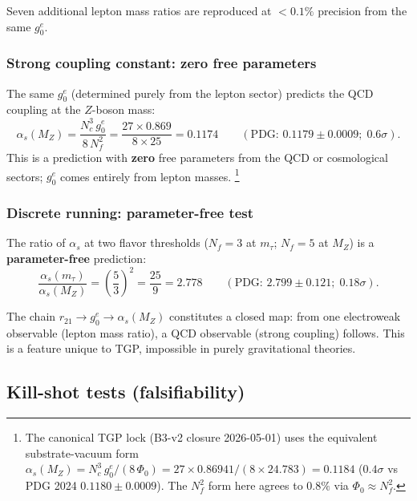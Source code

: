 \noindent
Seven additional lepton mass ratios are reproduced at
$<0.1\%$ precision from the same $g_{0}^{e}$.

\subsubsection{Strong coupling constant: zero free parameters}

The same $g_{0}^{e}$ (determined purely from the lepton sector)
predicts the QCD coupling at the $Z$-boson mass:
\begin{equation}\label{eq:alphas}
  \alpha_{s}(M_{Z})
  = \frac{N_{c}^{3}\,g_{0}^{e}}{8\,N_{f}^{2}}
  = \frac{27 \times 0.869}{8 \times 25}
  = 0.1174
  \qquad (\text{PDG: } 0.1179 \pm 0.0009;\; 0.6\sigma).
\end{equation}
This is a prediction with \textbf{zero} free parameters from the
QCD or cosmological sectors; $g_{0}^{e}$ comes entirely from lepton
masses.%
\footnote{The canonical TGP lock (B3-v2 closure 2026-05-01) uses the
equivalent substrate-vacuum form
$\alpha_{s}(M_Z) = N_{c}^{3}\,g_{0}^{e}/(8\,\Phi_{0}) =
27 \times 0.86941 / (8 \times 24.783) = 0.1184$
($0.4\sigma$ vs PDG 2024 $0.1180 \pm 0.0009$). The $N_f^2$ form here
agrees to $0.8\%$ via $\Phi_0 \approx N_f^2$.}

\subsubsection{Discrete running: parameter-free test}

The ratio of $\alpha_{s}$ at two flavor thresholds
($N_{f}=3$ at $m_{\tau}$; $N_{f}=5$ at $M_{Z}$) is a
\textbf{parameter-free} prediction:
\begin{equation}\label{eq:running-ratio}
  \frac{\alpha_{s}(m_{\tau})}{\alpha_{s}(M_{Z})}
  = \left(\frac{5}{3}\right)^{2}
  = \frac{25}{9}
  = 2.778
  \qquad (\text{PDG: } 2.799 \pm 0.121;\; 0.18\sigma).
\end{equation}

\begin{remark}[Implication]\label{rem:lepton-qcd}
The chain $r_{21}\to g_{0}^{e}\to\alpha_{s}(M_{Z})$ constitutes
a closed map: from one electroweak observable (lepton mass ratio),
a QCD observable (strong coupling) follows.  This is a feature
unique to TGP, impossible in purely gravitational theories.
\end{remark}

\subsection{Kill-shot tests (falsifiability)}\label{ssec:killshots}

